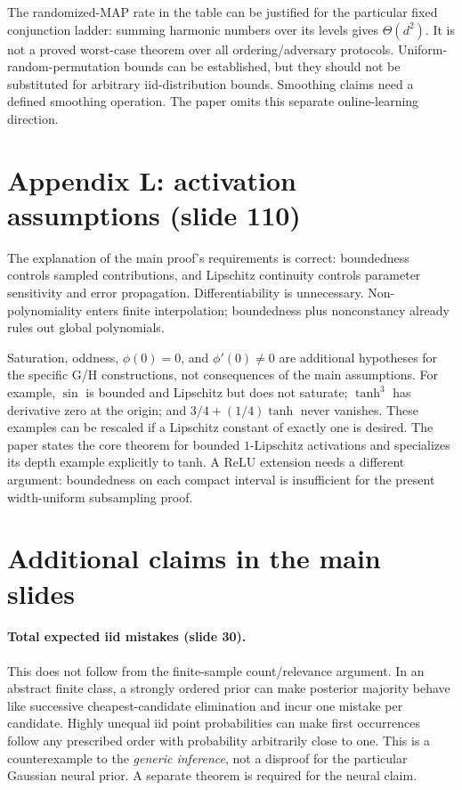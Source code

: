 \documentclass[11pt]{article}
\begin{document}
The randomized-MAP rate in the table can be justified for the particular fixed conjunction ladder: summing harmonic numbers over its levels gives $\Theta(d^2)$. It is not a proved worst-case theorem over all ordering/adversary protocols. Uniform-random-permutation bounds can be established, but they should not be substituted for arbitrary iid-distribution bounds. Smoothing claims need a defined smoothing operation. The paper omits this separate online-learning direction.

\section{Appendix L: activation assumptions (slide 110)}
The explanation of the main proof's requirements is correct: boundedness controls sampled contributions, and Lipschitz continuity controls parameter sensitivity and error propagation. Differentiability is unnecessary. Non-polynomiality enters finite interpolation; boundedness plus nonconstancy already rules out global polynomials.

Saturation, oddness, $\phi(0)=0$, and $\phi'(0)\ne0$ are additional hypotheses for the specific G/H constructions, not consequences of the main assumptions. For example, $\sin$ is bounded and Lipschitz but does not saturate; $\tanh^3$ has derivative zero at the origin; and $3/4+(1/4)\tanh$ never vanishes. These examples can be rescaled if a Lipschitz constant of exactly one is desired. The paper states the core theorem for bounded $1$-Lipschitz activations and specializes its depth example explicitly to tanh. A ReLU extension needs a different argument: boundedness on each compact interval is insufficient for the present width-uniform subsampling proof.

\section{Additional claims in the main slides}
\paragraph{Total expected iid mistakes (slide 30).}
This does not follow from the finite-sample count/relevance argument. In an abstract finite class, a strongly ordered prior can make posterior majority behave like successive cheapest-candidate elimination and incur one mistake per candidate. Highly unequal iid point probabilities can make first occurrences follow any prescribed order with probability arbitrarily close to one. This is a counterexample to the \emph{generic inference}, not a disproof for the particular Gaussian neural prior. A separate theorem is required for the neural claim.
\end{document}
